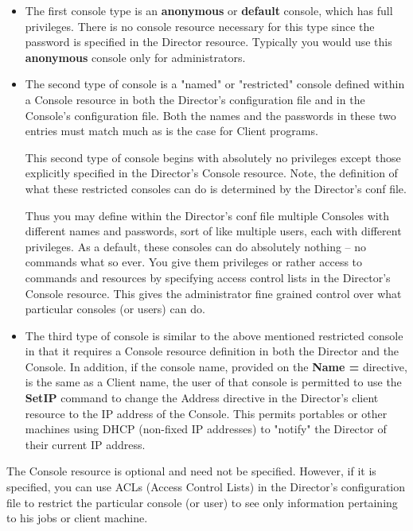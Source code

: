 \begin{itemize}
\item The first console type is an {\bf anonymous} or {\bf default}
   console, which has full privileges.  There is no console resource
   necessary for this type since the password is specified in the Director
   resource.  Typically you would use this {\bf anonymous} console
   only for administrators.

\item The second type of console is a
   "named" or "restricted" console defined within a Console resource in
   both the Director's configuration file and in the Console's
   configuration file.  Both the names and the passwords in these two
   entries must match much as is the case for Client programs.

   This second type of console begins with absolutely no privileges except
   those explicitly specified in the Director's Console resource.  Note,
   the definition of what these restricted consoles can do is determined 
   by the Director's conf file.

   Thus you may define within the Director's conf file multiple Consoles
   with different names and passwords, sort of like multiple users, each
   with different privileges.  As a default, these consoles can do
   absolutely nothing -- no commands what so ever.  You give them
   privileges or rather access to commands and resources by specifying
   access control lists in the Director's Console resource.  This gives the
   administrator fine grained control over what particular consoles (or
   users) can do.

\item The third type of console is similar to the above mentioned
   restricted console in that it requires a Console resource definition in
   both the Director and the Console.  In addition, if the console name,
   provided on the {\bf Name =} directive, is the same as a Client name,
   the user of that console is permitted to use the {\bf SetIP} command to
   change the Address directive in the Director's client resource to the IP
   address of the Console.  This permits portables or other machines using
   DHCP (non-fixed IP addresses) to "notify" the Director of their current
   IP address.

\end{itemize}

The Console resource is optional and need not be specified. However, if it is
specified, you can use ACLs (Access Control Lists) in the Director's
configuration file to restrict the particular console (or user) to see only
information pertaining to his jobs or client machine. 

